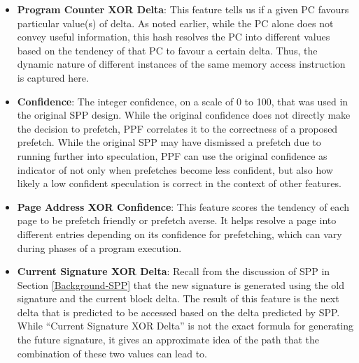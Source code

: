 \begin{itemize}
\item \textbf{Program Counter XOR Delta}: This feature tells us if a
  given PC favours particular value(s) of delta.  As noted earlier,
  while the PC alone does not convey useful information, this
  hash resolves the PC into different values based on the tendency of
  that PC to favour a certain delta.  Thus, the dynamic nature of
  different instances of the same memory access instruction is 
  captured here.

\item \textbf{Confidence}: The integer confidence, on a scale of 0 to
  100, that was used in the original SPP design. While the original 
  confidence does not directly make the decision to prefetch,
  PPF correlates it to the correctness of a proposed prefetch.
  While the original SPP may have dismissed a prefetch due to running
  further into speculation, PPF can use the original confidence as indicator
  of not only when prefetches become less confident, but also how likely
  a low confident speculation is correct in the context of other features.

\item \textbf{Page Address XOR Confidence}: This feature scores the
  tendency of each page to be prefetch friendly or prefetch averse. It
  helps resolve a page into different entries depending on its
  confidence for prefetching, which can vary during phases of a
  program execution.

\item \textbf{Current Signature XOR Delta}: Recall from the discussion
  of SPP in Section \ref{Background-SPP} that the new signature is
  generated using the old signature and the current block delta.
  The result of this feature is the next delta that is predicted to be
  accessed based on the delta predicted by SPP. While ``Current
  Signature XOR Delta'' is not the exact formula for generating the
  future signature, it gives an approximate idea of the path that the
  combination of these two values can lead to.



\end{itemize}
